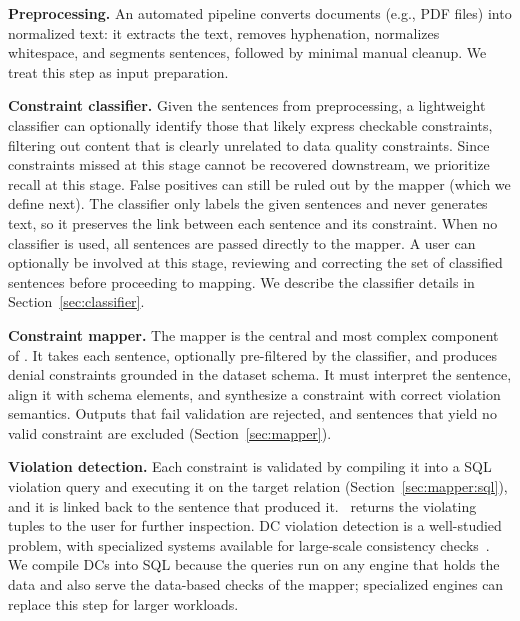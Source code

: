 \smallskip\noindent\textbf{Preprocessing.}
An automated pipeline converts documents (e.g., PDF files) into normalized text: it extracts the text, removes hyphenation, normalizes whitespace, and segments sentences, followed by minimal manual cleanup. We treat this step as input preparation.


\smallskip\noindent\textbf{Constraint classifier.}
Given the sentences from preprocessing, a lightweight classifier can optionally identify those that likely express checkable constraints, filtering out content that is clearly unrelated to data quality constraints.  Since constraints missed at this stage cannot be recovered downstream, we prioritize recall at this stage. False positives can still be ruled out by the mapper (which we define next). The classifier only labels the given sentences and never generates text, so it preserves the link between each sentence and its constraint. When no classifier is used, all sentences are passed directly to the mapper. A user can optionally be involved at this stage, reviewing and correcting the set of classified sentences before proceeding to mapping. We describe the classifier details in Section~\ref{sec:classifier}.


\smallskip\noindent\textbf{Constraint mapper.}
The mapper is the central and most complex component of \system. It takes each sentence, optionally pre-filtered by the classifier, and produces denial constraints grounded in the dataset schema.
It must interpret the sentence, align it with schema elements, and synthesize a constraint with correct violation semantics. Outputs that fail validation are rejected, and sentences that yield no valid constraint are excluded (Section~\ref{sec:mapper}).


\smallskip\noindent\textbf{Violation detection.}
Each constraint is validated by compiling it into a SQL violation query and executing it on the target relation (Section~\ref{sec:mapper:sql}), and it is linked back to the sentence that produced it. \system\ returns the violating tuples to the user for further inspection. DC violation detection is a well-studied problem, with specialized systems available for large-scale consistency checks~\cite{facet2021,liu2024rapidash,youri2024}. We compile DCs into SQL because the queries run on any engine that holds the data and also serve the data-based checks of the mapper; specialized engines can replace this step for larger workloads.


